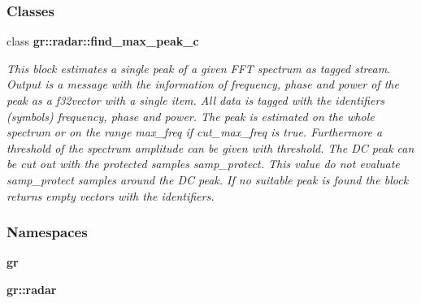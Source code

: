 \subsubsection*{Classes}
\begin{DoxyCompactItemize}
\item 
class {\bf gr\+::radar\+::find\+\_\+max\+\_\+peak\+\_\+c}
\begin{DoxyCompactList}\small\item\em This block estimates a single peak of a given F\+FT spectrum as tagged stream. Output is a message with the information of frequency, phase and power of the peak as a f32vector with a single item. All data is tagged with the identifiers (symbols) \textquotesingle{}frequency\textquotesingle{}, \textquotesingle{}phase\textquotesingle{} and \textquotesingle{}power\textquotesingle{}. The peak is estimated on the whole spectrum or on the range max\+\_\+freq if cut\+\_\+max\+\_\+freq is true. Furthermore a threshold of the spectrum amplitude can be given with threshold. The DC peak can be cut out with the protected samples samp\+\_\+protect. This value do not evaluate samp\+\_\+protect samples around the DC peak. If no suitable peak is found the block returns empty vectors with the identifiers. \end{DoxyCompactList}\end{DoxyCompactItemize}
\subsubsection*{Namespaces}
\begin{DoxyCompactItemize}
\item 
 {\bf gr}
\item 
 {\bf gr\+::radar}
\end{DoxyCompactItemize}
